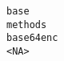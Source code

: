 \documentclass[
  letterpaper,
  DIV=11,
  numbers=noendperiod]{scrreprt}
\begin{document}
\begin{verbatim}
base                                                                                                                                                                                                                                                                                                                                                                                                                                                                                                                                                                                                                                                                                                                                                                                                                                                                                                                                                                                                                                                                                                                                                                                                                                                                                                  methods
base64enc                                                                                                                                                                                                                                                                                                                                                                                                                                                                                                                                                                                                                                                                                                                                                                                                                                                                                                                                                                                                                                                                                                                                                                                                                                                                                                <NA>

\end{verbatim}
\end{document}

